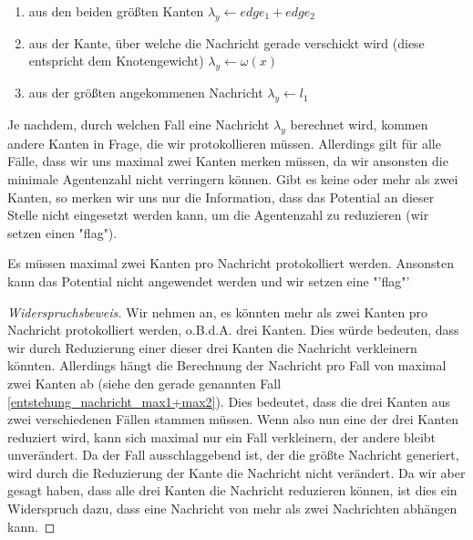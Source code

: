 \begin{enumerate}[label=\alph*)]
	
	\item aus den beiden größten Kanten $\lambda_{y} \gets edge_{1} + edge_{2}$ \label{entstehung_nachricht_max1+max2}
	
	\item aus der Kante, über welche die Nachricht gerade verschickt wird (diese entspricht dem Knotengewicht) $\lambda_{y} \gets \omega(x)$
	
	\item aus der größten angekommenen Nachricht $\lambda_{y} \gets l_{1}$

\end{enumerate}

Je nachdem, durch welchen Fall eine Nachricht $\lambda_{y}$ berechnet wird, kommen andere Kanten in Frage, die wir protokollieren müssen.
Allerdings gilt für alle Fälle, dass wir uns maximal zwei Kanten merken müssen, da wir ansonsten die minimale Agentenzahl nicht verringern können. Gibt es keine oder mehr als zwei Kanten, so merken wir uns nur die Information, dass das Potential an dieser Stelle nicht eingesetzt werden kann, um die Agentenzahl zu reduzieren (wir setzen einen "flag").

\begin{theorem}\label{theorem_max2kanten}
	Es müssen maximal zwei Kanten pro Nachricht protokolliert werden. Ansonsten kann das Potential nicht angewendet werden und wir setzen eine "'flag"'
\end{theorem}

\begin{proof}[Widerspruchsbeweis]
	Wir nehmen an, es könnten mehr als zwei Kanten pro Nachricht protokolliert werden, o.B.d.A. drei Kanten. Dies würde bedeuten, dass wir durch Reduzierung einer dieser drei Kanten die Nachricht verkleinern könnten. Allerdings hängt die Berechnung der Nachricht pro Fall von maximal zwei Kanten ab (siehe den gerade genannten Fall \ref{entstehung_nachricht_max1+max2}). Dies bedeutet, dass die drei Kanten aus zwei verschiedenen Fällen stammen müssen. Wenn also nun eine der drei Kanten reduziert wird, kann sich maximal nur ein Fall verkleinern, der andere bleibt unverändert. Da der Fall ausschlaggebend ist, der die größte Nachricht generiert, wird durch die Reduzierung der Kante die Nachricht nicht verändert. Da wir aber gesagt haben, dass alle drei Kanten die Nachricht reduzieren können, ist dies ein Widerspruch dazu, dass eine Nachricht von mehr als zwei Nachrichten abhängen kann.
\end{proof}

